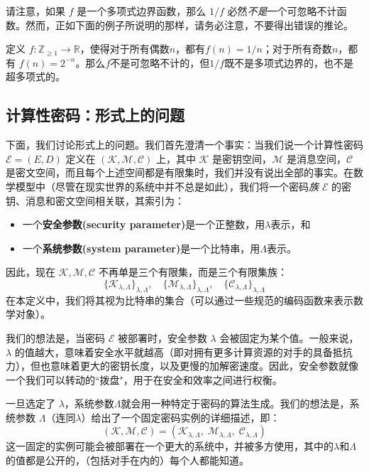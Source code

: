 请注意，如果 $f$ 是一个多项式边界函数，那么 ${1}/{f}$ 必然\emph{不是}一个可忽略不计函数。然而，正如下面的例子所说明的那样，请务必注意，不要得出错误的推论。

\begin{example}
定义 $f:\mathbb{Z}_{\geq1}\to\mathbb{R}$，使得对于所有偶数$n$，都有$f(n)={1}/{n}$；对于所有奇数$n$，都有 $f(n)=2^{-n}$。那么$f$不是可忽略不计的，但${1}/{f}$既不是多项式边界的，也不是超多项式的。
\end{example}

\subsection{计算性密码：形式上的问题}

下面，我们讨论形式上的问题。我们首先澄清一个事实：当我们说一个计算性密码 $\mathcal{E}=(E,D)$ 定义在 $(\mathcal{K},\mathcal{M},\mathcal{C})$ 上，其中 $\mathcal{K}$ 是密钥空间，$\mathcal{M}$ 是消息空间，$\mathcal{C}$ 是密文空间，而且每个上述空间都是有限集时，我们并没有说出全部的事实。在数学模型中（尽管在现实世界的系统中并不总是如此），我们将一个密码\emph{族} $\mathcal{E}$ 的密钥、消息和密文空间相关联，其索引为：
\begin{itemize}
	\item 一个\textbf{安全参数(security parameter)}是一个正整数，用$\lambda$表示，和
	\item 一个\textbf{系统参数(system parameter)}是一个比特串，用$\Lambda$表示。
\end{itemize}
因此，现在 $\mathcal{K},\mathcal{M},\mathcal{C}$ 不再单是三个有限集，而是三个有限集族：
$$
\{\mathcal{K}_{\lambda,\Lambda}\}_{\lambda,\Lambda},\quad
\{\mathcal{M}_{\lambda,\Lambda}\}_{\lambda,\Lambda},\quad
\{\mathcal{C}_{\lambda,\Lambda}\}_{\lambda,\Lambda}
$$
在本定义中，我们将其视为比特串的集合（可以通过一些规范的编码函数来表示数学对象）。

我们的想法是，当密码 $\mathcal{E}$ 被部署时，安全参数 $\lambda$ 会被固定为某个值。一般来说，$\lambda$ 的值越大，意味着安全水平就越高（即对拥有更多计算资源的对手的具备抵抗力），但也意味着更大的密钥长度，以及更慢的加解密速度。因此，安全参数就像一个我们可以转动的``拨盘"，用于在安全和效率之间进行权衡。

一旦选定了 $\lambda$，系统参数$\Lambda$就会用一种特定于密码的算法生成。我们的想法是，系统参数 $\Lambda$（连同$\lambda$）给出了一个固定密码实例的详细描述，即：
$$
(\mathcal{K},\mathcal{M},\mathcal{C})=(\mathcal{K}_{\lambda,\Lambda},\;\mathcal{M}_{\lambda,\Lambda},\;\mathcal{C}_{\lambda,\Lambda})
$$
这一固定的实例可能会被部署在一个更大的系统中，并被多方使用，其中的$\lambda$和$\Lambda$的值都是公开的，（包括对手在内的）每个人都能知道。

